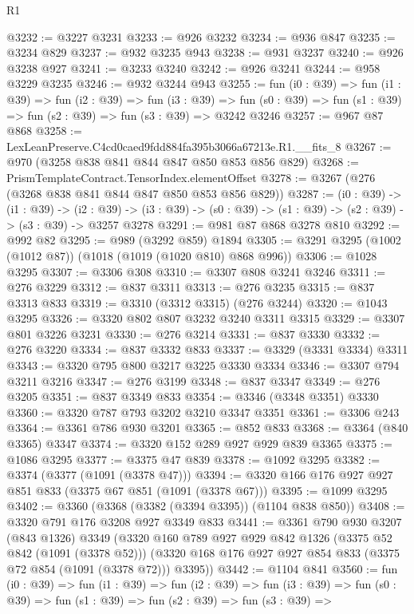 \begin{lexlean}{R1}
\begin{coremodule}
@3232 := @3227 @3231
@3233 := @926 @3232
@3234 := @936 @847
@3235 := @3234 @829
@3237 := @932 @3235 @943
@3238 := @931 @3237
@3240 := @926 @3238 @927
@3241 := @3233 @3240
@3242 := @926 @3241
@3244 := @958 @3229 @3235
@3246 := @932 @3244 @943
@3255 := fun (i0 : @39) =>
  fun (i1 : @39) =>
  fun (i2 : @39) =>
  fun (i3 : @39) =>
  fun (s0 : @39) => fun (s1 : @39) => fun (s2 : @39) => fun (s3 : @39) => @3242 @3246
@3257 := @967 @87 @868
@3258 := LexLeanPreserve.C4cd0caed9fdd884fa395b3066a67213e.R1.__fits_8
@3267 := @970 (@3258 @838 @841 @844 @847 @850 @853 @856 @829)
@3268 := PrismTemplateContract.TensorIndex.elementOffset
@3278 := @3267 (@276 (@3268 @838 @841 @844 @847 @850 @853 @856 @829))
@3287 := (i0 : @39) ->
  (i1 : @39) ->
  (i2 : @39) -> (i3 : @39) -> (s0 : @39) -> (s1 : @39) -> (s2 : @39) -> (s3 : @39) -> @3257 @3278
@3291 := @981 @87 @868 @3278 @810
@3292 := @992 @82
@3295 := @989 (@3292 @859) @1894
@3305 := @3291 @3295 (@1002 (@1012 @87)) (@1018 (@1019 (@1020 @810) @868 @996))
@3306 := @1028 @3295
@3307 := @3306 @308
@3310 := @3307 @808 @3241 @3246
@3311 := @276 @3229
@3312 := @837 @3311
@3313 := @276 @3235
@3315 := @837 @3313 @833
@3319 := @3310 (@3312 @3315) (@276 @3244)
@3320 := @1043 @3295
@3326 := @3320 @802 @807 @3232 @3240 @3311 @3315
@3329 := @3307 @801 @3226 @3231
@3330 := @276 @3214
@3331 := @837 @3330
@3332 := @276 @3220
@3334 := @837 @3332 @833
@3337 := @3329 (@3331 @3334) @3311
@3343 := @3320 @795 @800 @3217 @3225 @3330 @3334
@3346 := @3307 @794 @3211 @3216
@3347 := @276 @3199
@3348 := @837 @3347
@3349 := @276 @3205
@3351 := @837 @3349 @833
@3354 := @3346 (@3348 @3351) @3330
@3360 := @3320 @787 @793 @3202 @3210 @3347 @3351
@3361 := @3306 @243
@3364 := @3361 @786 @930 @3201
@3365 := @852 @833
@3368 := @3364 (@840 @3365) @3347
@3374 := @3320 @152 @289 @927 @929 @839 @3365
@3375 := @1086 @3295
@3377 := @3375 @47 @839
@3378 := @1092 @3295
@3382 := @3374 (@3377 (@1091 (@3378 @47)))
@3394 := @3320 @166 @176 @927 @927 @851 @833 (@3375 @67 @851 (@1091 (@3378 @67)))
@3395 := @1099 @3295
@3402 := @3360 (@3368 (@3382 (@3394 @3395)) (@1104 @838 @850))
@3408 := @3320 @791 @176 @3208 @927 @3349 @833
@3441 := @3361
    @790
    @930
    @3207
    (@843 @1326)
    @3349
    (@3320
      @160
      @789
      @927
      @929
      @842
      @1326
      (@3375 @52 @842 (@1091 (@3378 @52)))
      (@3320 @168 @176 @927 @927 @854 @833 (@3375 @72 @854 (@1091 (@3378 @72))) @3395))
@3442 := @1104 @841
@3560 := fun (i0 : @39) =>
  fun (i1 : @39) =>
  fun (i2 : @39) =>
  fun (i3 : @39) =>
  fun (s0 : @39) =>
  fun (s1 : @39) =>
  fun (s2 : @39) =>
  fun (s3 : @39) =>

\end{coremodule}
\end{lexlean}
